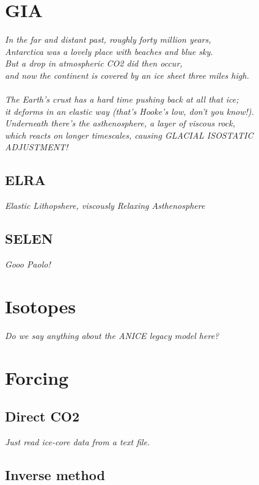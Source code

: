 \documentclass{article}
\begin{document}
\newpage
\section{GIA}

\textit{In the far and distant past, roughly forty million years,\\
Antarctica was a lovely place with beaches and blue sky.\\
But a drop in atmospheric CO2 did then occur,\\
and now the continent is covered by an ice sheet three miles high.\\
\\
The Earth's crust has a hard time pushing back at all that ice;\\
it deforms in an elastic way (that's Hooke's low, don't you know!).\\
Underneath there's the asthenosphere, a layer of viscous rock,\\
which reacts on longer timescales, causing GLACIAL ISOSTATIC ADJUSTMENT!}

\subsection{ELRA}

\textit{Elastic Lithopshere, viscously Relaxing Asthenosphere}

\subsection{SELEN}

\textit{Gooo Paolo!}

\newpage
\section{Isotopes}

\textit{Do we say anything about the ANICE legacy model here?}

\newpage
\section{Forcing}

\subsection{Direct CO2}

\textit{Just read ice-core data from a text file.}

\subsection{Inverse method}
\end{document}
